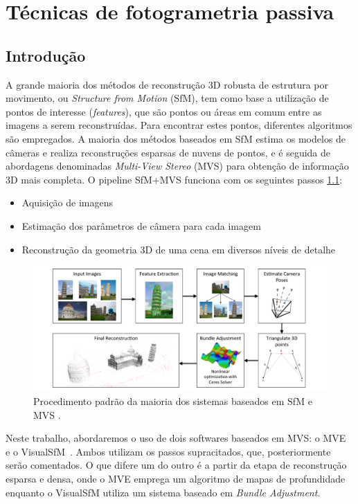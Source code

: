 \chapter{Técnicas de fotogrametria passiva}\label{cap:pontosdeinteresse}
%
\section*{Introdução}

A grande maioria dos métodos de reconstrução 3D robusta de estrutura por movimento, ou \emph{Structure
from Motion} (SfM), tem como base a utilização de pontos de interesse
(\emph{features}), que são pontos ou áreas em comum entre as imagens a serem
reconstruídas. Para encontrar estes pontos, diferentes algoritmos são empregados. 
A maioria dos métodos baseados em SfM estima os modelos de câmeras e
realiza reconstruções esparsas de nuvens de pontos, e é seguida de abordagens denominadas
\emph{Multi-View Stereo} (MVS) para obtenção de informação 3D mais completa.  O
pipeline SfM+MVS funciona com os seguintes passos \ref{fig:sfmpipeline}:

\begin{itemize}
\item{Aquisição de imagens}
\item{Estimação dos parâmetros de câmera para cada imagem}
\item{Reconstrução da geometria 3D de uma cena em diversos níveis de detalhe}
\end{itemize}

\begin{figure}[!h]
	\centering
	\includegraphics[width=\linewidth]{figs/pipelinesfm.png}
	\caption{%
	Procedimento padrão da maioria dos sistemas baseados em SfM e MVS
	\protect\cite{theia-manual}.
	}\label{fig:sfmpipeline}
\end{figure}

Neste trabalho, abordaremos o uso de dois softwares baseados em MVS: o MVE~\cite{mve} e o VisualSfM~\cite{wu2011visualsfm}. Ambos utilizam os passos supracitados, que, posteriormente serão comentados. O que difere um do outro é a partir da etapa de reconstrução esparsa e densa, onde o MVE emprega um algoritmo de mapas de profundidade enquanto o VisualSfM utiliza um sistema baseado em \emph{Bundle Adjustment}. 

